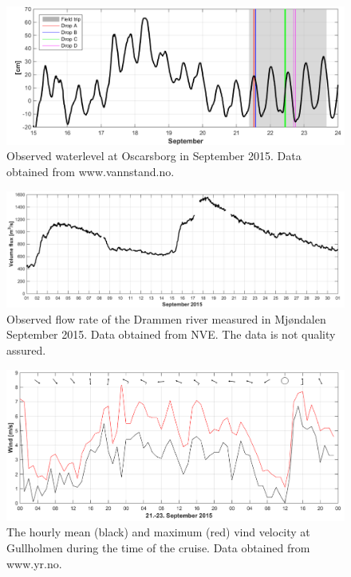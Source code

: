 \documentclass[12pt,a4paper,english]{article}
\begin{document}
\begin{figure}[tb]
\centerline{
\includegraphics*[width=\textwidth]{Figurer/Vannstand}}
\caption{\small
Observed waterlevel at Oscarsborg in September 2015. Data obtained from www.vannstand.no.}
\label{fig:Waterlevel}
\end{figure}

\begin{figure}[tb]
\centerline{
\includegraphics*[width=\textwidth]{Figurer/River}}
\caption{\small
Observed flow rate of the Drammen river measured in Mj\o ndalen September 2015. Data obtained from NVE. The data is not quality assured.}
\label{fig:River}
\end{figure}

\begin{figure}[tb]
\centerline{
\includegraphics*[width=\textwidth]{Figurer/Gullholmen_vind_sep2015}}
\caption{\small
The hourly mean (black) and maximum (red) vind velocity at Gullholmen during the time of the cruise. Data obtained from www.yr.no.}
\label{fig:Wind}
\end{figure}
\end{document}
